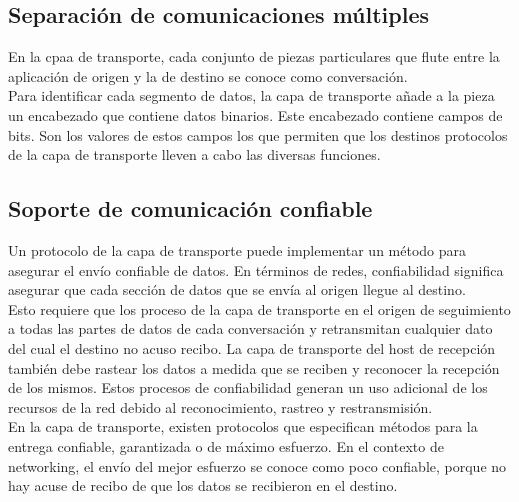 \documentclass[12pt]{report}
\begin{document}
        \subsection{Separación de comunicaciones múltiples}
        En la cpaa de transporte, cada conjunto de piezas particulares que flute entre la aplicación de origen y la de destino se conoce como conversación.
        \\Para identificar cada segmento de datos, la capa de transporte añade a la pieza un encabezado que contiene datos binarios. Este encabezado contiene campos de bits.
        Son los valores de estos campos los que permiten que los destinos protocolos de la capa de transporte lleven a cabo las diversas funciones.
        \subsection{Soporte de comunicación confiable}
        Un protocolo de la capa de transporte puede implementar un método para asegurar el envío confiable de datos. En términos de redes, confiabilidad significa asegurar que cada sección de datos que se envía al origen llegue al destino.
        \\Esto requiere que los proceso de la capa de transporte en el origen de seguimiento a todas las partes de datos de cada conversación y retransmitan cualquier dato del cual el destino no acuso recibo.
        La capa de transporte del host de recepción también debe rastear los datos a medida que se reciben y reconocer la recepción de los mismos.
        Estos procesos de confiabilidad generan un uso adicional de los recursos de la red debido al reconocimiento, rastreo y restransmisión.
        \\En la capa de transporte, existen protocolos que especifican métodos para la entrega confiable, garantizada o de máximo esfuerzo.
        En el contexto de networking, el envío del mejor esfuerzo se conoce como poco confiable, porque no hay acuse de recibo de que los datos se recibieron en el destino.
\end{document}
